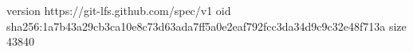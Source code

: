 version https://git-lfs.github.com/spec/v1
oid sha256:1a7b43a29cb3ca10e8c73d63ada7ff5a0e2eaf792fcc3da34d9c9c32e48f713a
size 43840
